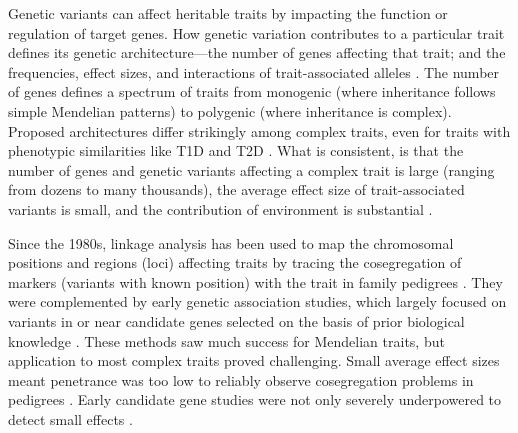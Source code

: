\begin{outline}
Genetic variants can affect heritable traits by impacting the function or regulation of target genes.
How genetic variation contributes to a particular trait defines its genetic architecture---the number of genes affecting that trait; and the frequencies, effect sizes, and interactions of trait-associated alleles \autocite{timpson2018GeneticArchitectureShape,visscher2019Fisher1918Paper}.
The number of genes defines a spectrum of traits from monogenic (where inheritance follows simple Mendelian patterns) to polygenic (where inheritance is complex).
Proposed architectures differ strikingly among complex traits, 
even for traits with phenotypic similarities like \gls{T1D} and \gls{T2D} \autocite{timpson2018GeneticArchitectureShape}.
What is consistent, is that the number of genes and genetic variants affecting a complex trait is large (ranging from dozens to many thousands),
the average effect size of trait-associated variants is small, 
and the contribution of environment is substantial \autocite{hindorff2009PotentialEtiologicFunctional,gibson2011RareCommonVariants,boyle2017ExpandedViewComplex}.

Since the 1980s, linkage analysis has been used to map the chromosomal positions and regions (loci) affecting traits by tracing the cosegregation of markers (variants with known position) with the trait in family pedigrees \autocite{altshuler2008GeneticMappingHuman,ott2011FamilybasedDesignsGenomewide,visscher2012FiveYearsGWAS}.
They were complemented by early genetic association studies, which largely focused on variants in or near candidate genes selected on the basis of prior biological knowledge \autocite{hirschhorn2002ComprehensiveReviewGenetic}.
These methods saw much success for Mendelian traits, but application to most complex traits proved challenging.
Small average effect sizes meant penetrance was too low to reliably observe cosegregation problems in pedigrees \autocite{visscher2012FiveYearsGWAS}.
Early candidate gene studies were not only severely underpowered to detect small effects \autocite{border2019NoSupportHistorical}.


\end{outline}
